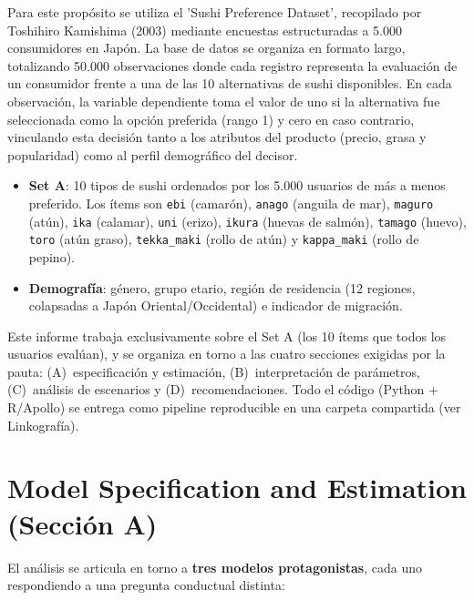 \documentclass[12pt,a4paper]{article}
\begin{document}
Para este propósito se utiliza el 'Sushi Preference Dataset', recopilado por Toshihiro Kamishima (2003) mediante encuestas estructuradas a 5.000 consumidores en Japón. La base de datos se organiza en formato largo, totalizando 50.000 observaciones donde cada registro representa la evaluación de un consumidor frente a una de las 10 alternativas de sushi disponibles. En cada observación, la variable dependiente toma el valor de uno si la alternativa fue seleccionada como la opción preferida (rango 1) y cero en caso contrario, vinculando esta decisión tanto a los atributos del producto (precio, grasa y popularidad) como al perfil demográfico del decisor.

\begin{itemize}[nosep]
  \item \textbf{Set A}: 10 tipos de sushi ordenados por los 5.000 usuarios de más a menos preferido. Los ítems son \texttt{ebi} (camarón), \texttt{anago} (anguila de mar), \texttt{maguro} (atún), \texttt{ika} (calamar), \texttt{uni} (erizo), \texttt{ikura} (huevas de salmón), \texttt{tamago} (huevo), \texttt{toro} (atún graso), \texttt{tekka\_maki} (rollo de atún) y \texttt{kappa\_maki} (rollo de pepino).
  \item \textbf{Demografía}: género, grupo etario, región de residencia (12 regiones, colapsadas a Japón Oriental/Occidental) e indicador de migración.
\end{itemize}

Este informe trabaja exclusivamente sobre el Set A (los 10 ítems que todos los usuarios evalúan), y se organiza en torno a las cuatro secciones exigidas por la pauta: (A)~especificación y estimación, (B)~interpretación de parámetros, (C)~análisis de escenarios y (D)~recomendaciones. Todo el código (Python + R/Apollo) se entrega como pipeline reproducible en una carpeta compartida (ver Linkografía).

\section{Model Specification and Estimation (Sección A)}
\label{sec:A}

El análisis se articula en torno a \textbf{tres modelos protagonistas}, cada uno respondiendo a una pregunta conductual distinta:
\end{document}
